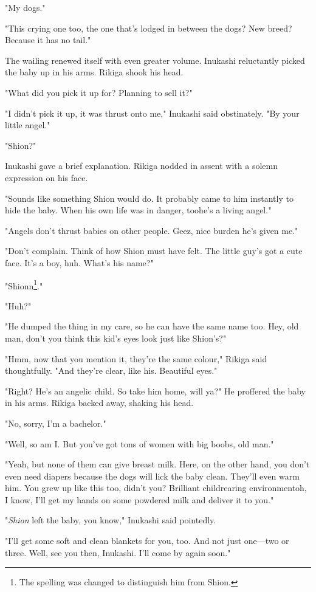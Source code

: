 "My dogs."

"This crying one too, the one that's lodged in between the dogs? New
breed? Because it has no tail."

The wailing renewed itself with even greater volume. Inukashi
reluctantly picked the baby up in his arms. Rikiga shook his head.

"What did you pick it up for? Planning to sell it?"

"I didn't pick it up, it was thrust onto me," Inukashi said obstinately.
"By your little angel."

"Shion?"

Inukashi gave a brief explanation. Rikiga nodded in assent with a solemn
expression on his face.

"Sounds like something Shion would do. It probably came to him instantly
to hide the baby. When his own life was in danger, too\el he's a living
angel."

"Angels don't thrust babies on other people. Geez, nice burden he's
given me."

"Don't complain. Think of how Shion must have felt. The little guy's got
a cute face. It's a boy, huh. What's his name?"

"Shionn\footnote{The spelling was changed to distinguish him from Shion.}."

"Huh?"

"He dumped the thing in my care, so he can have the same name too. Hey,
old man, don't you think this kid's eyes look just like Shion's?"

"Hmm, now that you mention it, they're the same colour," Rikiga said
thoughtfully. "And they're clear, like his. Beautiful eyes."

"Right? He's an angelic child. So take him home, will ya?" He proffered
the baby in his arms. Rikiga backed away, shaking his head.

"No, sorry, I'm a bachelor."

"Well, so am I. But you've got tons of women with big boobs, old man."

"Yeah, but none of them can give breast milk. Here, on the other hand,
you don't even need diapers because the dogs will lick the baby clean.
They'll even warm him. You grew up like this too, didn't you? Brilliant
childrearing environment\el oh, I know, I'll get my hands on some
powdered milk and deliver it to you."

"\emph{Shion} left the baby, you know," Inukashi said pointedly.

"I'll get some soft and clean blankets for you, too. And not just
one---two or three. Well, see you then, Inukashi. I'll come by again
soon."

